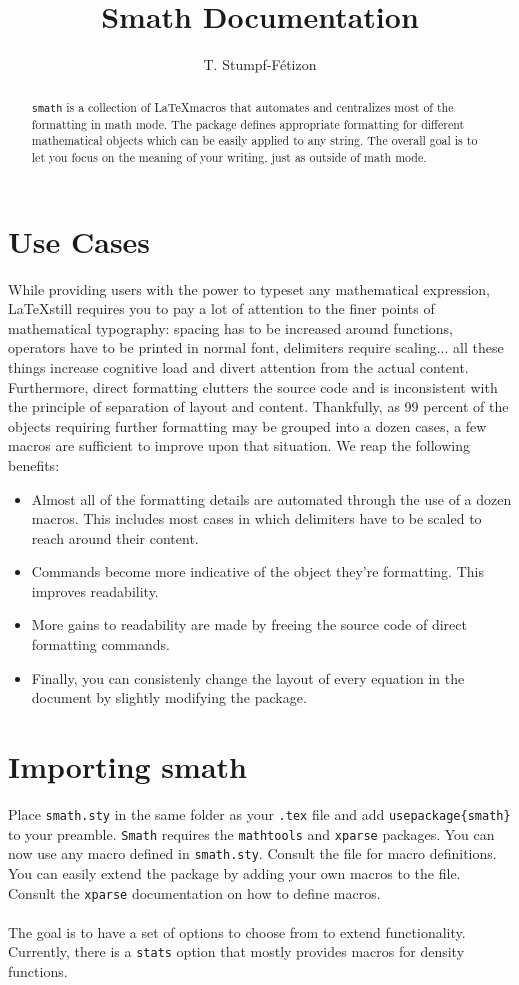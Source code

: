 \documentclass[a4paper,10pt]{scrartcl}
\title{Smath Documentation}
\author{T. Stumpf-Fétizon}
\begin{document}
\maketitle

\begin{abstract}
\texttt{smath} is a collection of \LaTeX macros that automates and centralizes most of the formatting in math mode. The package defines appropriate formatting for different mathematical objects which can be easily applied to any string. The overall goal is to let you focus on the meaning of your writing, just as outside of math mode.
\end{abstract}

\section{Use Cases}
While providing users with the power to typeset any mathematical expression, \LaTeX still requires you to pay a lot of attention to the finer points of mathematical typography: spacing has to be increased around functions, operators have to be printed in normal font, delimiters require scaling... all these things increase cognitive load and divert attention from the actual content. Furthermore, direct formatting clutters the source code and is inconsistent with the principle of separation of layout and content. Thankfully, as 99 percent of the objects requiring further formatting may be grouped into a dozen cases, a few macros are sufficient to improve upon that situation. We reap the following benefits:
\begin{itemize}
  \item Almost all of the formatting details are automated through the use of a dozen macros. This includes most cases in which delimiters have to be scaled to reach around their content.
  \item Commands become more indicative of the object they're formatting. This improves readability.
  \item More gains to readability are made by freeing the source code of direct formatting commands.
  \item Finally, you can consistenly change the layout of every equation in the document by slightly modifying the package.
\end{itemize}

\section{Importing smath}
Place \texttt{smath.sty} in the same folder as your \texttt{.tex} file and add \texttt{usepackage\{smath\}} to your preamble. \texttt{Smath} requires the \texttt{mathtools} and \texttt{xparse} packages. You can now use any macro defined in \texttt{smath.sty}. Consult the file for macro definitions. You can easily extend the package by adding your own macros to the file. Consult the \texttt{xparse} documentation on how to define macros.\\\\
The goal is to have a set of options to choose from to extend functionality. Currently, there is a \texttt{stats} option that mostly provides macros for density functions.
\end{document}
